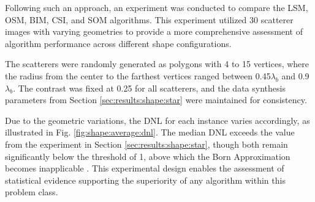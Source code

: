 \documentclass{IEEEtran}
\begin{document}
                Following such an approach, an experiment was conducted to compare the LSM, OSM, BIM, CSI, and SOM algorithms. This experiment utilized 30 scatterer images with varying geometries to provide a more comprehensive assessment of algorithm performance across different shape configurations.

                The scatterers were randomly generated as polygons with 4 to 15 vertices, where the radius from the center to the farthest vertices ranged between 0.45$\lambda_b$ and 0.9$\lambda_b$. The contrast was fixed at 0.25 for all scatterers, and the data synthesis parameters from Section \ref{sec:results:shape:star} were maintained for consistency. 

                Due to the geometric variations, the DNL for each instance varies accordingly, as illustrated in Fig. \ref{fig:shape:average:dnl}. The median DNL exceeds the value from the experiment in Section \ref{sec:results:shape:star}, though both remain significantly below the threshold of 1, above which the Born Approximation becomes inapplicable \cite{bucci2001degree}. This experimental design enables the assessment of statistical evidence supporting the superiority of any algorithm within this problem class.
\end{document}
